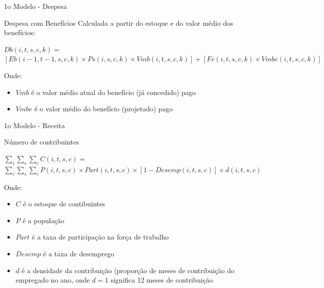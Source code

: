 \begin{frame}{1o Modelo - Despesa}
  \begin{block}{Despesa com Benefícios}
    Calculada a partir do estoque e do valor médio dos benefícios:
      \begin{center}
  \scriptsize
$Db(i,t,s,c,k) =$
$[Eb(i-1, t-1, s, c, k) \times Ps(i,s,c,k) \times Vmb(i,t,s,c,k)] + [Fe(i, t ,s, c, k) \times Vmbe(i,t,s,c,k)]$
      \end{center}
  \end{block}
  \scriptsize
    Onde:
    \begin{itemize}
      \item $Vmb$ é o valor médio atual do benefício (já concedido) pago
      \item $Vmbe$ é o valor médio do benefício (projetado) pago
    \end{itemize}
\end{frame}

\begin{frame}{1o Modelo - Receita}
  \begin{block}{Número de contribuintes}
  \scriptsize
      \begin{center}
      $\sum_i \sum_s \sum_c C(i,t,s,c) =$ \\
       $\sum_i \sum_s \sum_c P(i,t,s,c) \times Part(i,t,s,c) \times [1-Desemp(i,t,s,c)] \times d(i,t,s,c)$
      \end{center}
  \end{block}
  \scriptsize
    Onde:
    \begin{itemize}
      \item $C$ é o estoque de contibuintes
      \item $P$ é a população
      \item $Part$ é a taxa de participação na força de trabalho
      \item $Desemp$ é a taxa de desemprego
      \item $d$ é a densidade da contribuição (proporção de meses de contribuição do empregado no ano, onde $d=1$ significa 12 meses de contribuição
    \end{itemize}
\end{frame}

